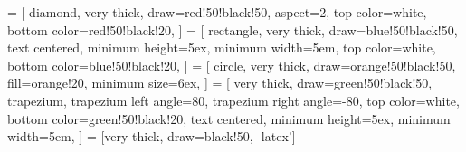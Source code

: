  = [
  diamond,
  very thick,
  draw=red!50!black!50,
  aspect=2,
  top color=white,
  bottom color=red!50!black!20,
]
 = [
  rectangle,
  very thick,
  draw=blue!50!black!50,
  text centered,
  minimum height=5ex,
  minimum width=5em,
  top color=white,
  bottom color=blue!50!black!20,
]
 = [
  circle,
  very thick,
  draw=orange!50!black!50,
  fill=orange!20,
  minimum size=6ex,
]
 = [
  very thick,
  draw=green!50!black!50,
  trapezium,
  trapezium left angle=80,
  trapezium right angle=-80,
  top color=white,
  bottom color=green!50!black!20,
  text centered,
  minimum height=5ex,
  minimum width=5em,
]
 = [very thick, draw=black!50, -latex']

